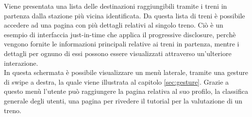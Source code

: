 Viene presentata una lista delle destinazioni raggiungibili tramite i treni in partenza dalla stazione più vicina identificata. Da questa lista di treni è possibile accedere ad una pagina con più dettagli relativi al singolo treno.
Ciò è un esempio di interfaccia just-in-time che applica il progressive disclosure, perchè vengono fornite le informazioni principali relative ai treni in partenza, mentre i dettagli per ognuno di essi possono essere visualizzati attraverso un'ulteriore interazione.\\
In questa schermata è possibile visualizzare un menù laterale, tramite una gesture di swipe a destra, la quale viene illustrata al capitolo \ref{sec:gesture}. Grazie a questo menù l'utente può raggiungere la pagina relativa al suo profilo, la classifica generale degli utenti, una pagina per rivedere il tutorial per la valutazione di un treno.
